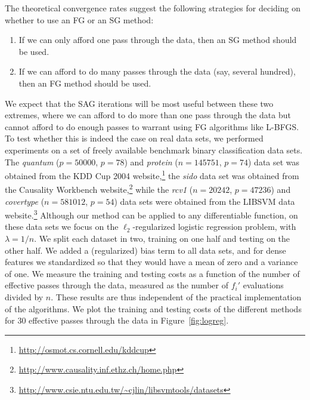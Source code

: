 \documentclass{article}
\begin{document}
The theoretical convergence rates suggest the following strategies for
deciding on whether to use an FG or an SG method:
\begin{enumerate}
\item If we can only afford one pass through the data, then an SG method should
be used.
\item If we can afford to do many passes through the data (say, several
hundred), then an FG method should be used.
\end{enumerate}
We expect that the SAG iterations will be most useful between these two extremes, where we can afford to do more than one pass through the data but cannot afford to do enough passes to warrant using FG algorithms like L-BFGS.  To test whether this is indeed the case on real data sets, we performed experiments on a set of freely available benchmark binary classification data sets.  The 
\emph{quantum} ($p=50 000$, $p=78$) and 
\emph{protein}   ($n=145 751$, $p=74$) data set was obtained from the KDD Cup 2004 website,\footnote{\small \url{http://osmot.cs.cornell.edu/kddcup}} the \emph{sido} data set was obtained from the Causality Workbench website,\footnote{ \small\url{http://www.causality.inf.ethz.ch/home.php}}
 while the \emph{rcv1}  ($n= 20 242$, $p=47 236$) and \emph{covertype}   ($n=581 012 $, $p=54$) data sets were obtained from the LIBSVM data website.\footnote{ \small\url{http://www.csie.ntu.edu.tw/~cjlin/libsvmtools/datasets}}
Although our method can be applied to any differentiable function, on these data sets we focus on the $\ell_2$-regularized logistic regression problem, with $\lambda=1/n$.
We split each dataset in two, training on one half and testing on the other half.  
We added a (regularized) bias term to all data sets, and for dense features we standardized so that they would have a mean of zero and a variance of one.
We measure the training and testing costs as a function of the number of effective passes through the data, measured as the number of $f_i'$ evaluations divided by $n$. These results are thus independent of the practical implementation of the algorithms. We plot the training and testing costs of the different methods for 30 effective passes  through the data in Figure~\ref{fig:logreg}.  

\end{document}
